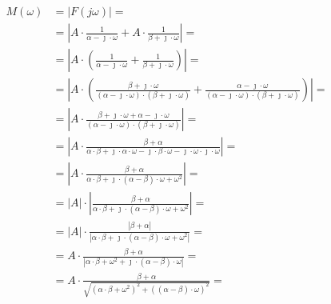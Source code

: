 \begin{task}

\begin{align*}
M(\omega)&=\left| F(j \omega) \right|=\\
&=\left| A \cdot \frac{1}{\alpha -\jmath \cdot \omega }
+A \cdot \frac{1}{\beta +\jmath \cdot \omega } \right|=\\
&=\left| A \cdot \left( \frac{1}{\alpha -\jmath \cdot \omega }
+ \frac{1}{\beta +\jmath \cdot \omega }\right) \right|=\\
&=\left| A \cdot \left( \frac{\beta +\jmath \cdot \omega}{\left(\alpha -\jmath \cdot \omega \right) \cdot \left(\beta +\jmath \cdot \omega \right)}
+ \frac{\alpha -\jmath \cdot \omega}{\left(\alpha -\jmath \cdot \omega \right) \cdot \left(\beta +\jmath \cdot \omega \right) }\right) \right|=\\
&=\left| A \cdot \frac{\beta +\jmath \cdot \omega + \alpha -\jmath \cdot \omega}{\left(\alpha -\jmath \cdot \omega \right) \cdot \left(\beta +\jmath \cdot \omega \right)} \right|=\\
&=\left| A \cdot \frac{\beta + \alpha}{ \alpha \cdot \beta + \jmath \cdot \alpha \cdot \omega - \jmath \cdot \beta \cdot \omega - \jmath \cdot \omega \cdot \jmath \cdot \omega} \right|=\\
&=\left| A \cdot \frac{\beta + \alpha}{ \alpha \cdot \beta + \jmath \cdot\left( \alpha - \beta \right)\cdot \omega + \omega^2} \right|=\\
&=\left| A \right| \cdot \left| \frac{\beta + \alpha}{ \alpha \cdot \beta + \jmath \cdot\left( \alpha - \beta \right)\cdot \omega + \omega^2} \right|=\\
&=\left| A \right| \cdot \frac{ \left|\beta + \alpha \right|}{ \left| \alpha \cdot \beta + \jmath \cdot\left( \alpha - \beta \right)\cdot \omega + \omega^2 \right|}=\\
&=A \cdot \frac{ \beta + \alpha }{ \left| \alpha \cdot \beta + \omega^2 + \jmath \cdot\left( \alpha - \beta \right)\cdot \omega\right|}=\\
&=A \cdot \frac{ \beta + \alpha }{ \sqrt{\left( \alpha \cdot \beta + \omega^2 \right)^2+ \left(\left( \alpha - \beta \right)\cdot \omega\right)^2}}=\\
\end{align*}

\begin{figure}[H]
  \centering
\end{figure}
\end{task}
